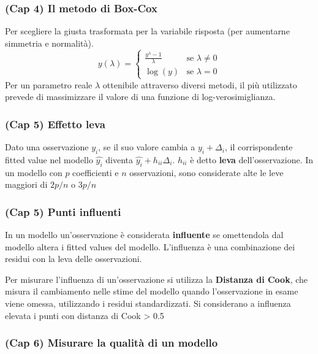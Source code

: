 \documentclass[
]{article}
\begin{document}
\hypertarget{cap-4-il-metodo-di-box-cox}{%
\subsubsection{(Cap 4) Il metodo di
Box-Cox}\label{cap-4-il-metodo-di-box-cox}}

Per scegliere la giusta trasformata per la variabile risposta (per
aumentarne simmetria e normalità). \[ y(\lambda) =
\begin{cases}
\frac{y^{\lambda}-1}{\lambda}   &\text{se $\lambda \neq 0$} \\
\log(y)     &\text{se $\lambda = 0$}
\end{cases}
\] Per un parametro reale \(\lambda\) ottenibile attraverso diversi
metodi, il più utilizzato prevede di massimizzare il valore di una
funzione di log-verosimiglianza.

\hypertarget{cap-5-effetto-leva}{%
\subsubsection{(Cap 5) Effetto leva}\label{cap-5-effetto-leva}}

Dato una osservazione \(y_i\), se il suo valore cambia a
\(y_i + \Delta_i\), il corrispondente fitted value nel modello
\(\hat{y_i}\) diventa \(\hat{y_i}+h_{ii}\Delta_i\). \(h_{ii}\) è detto
\textbf{leva} dell'osservazione. In un modello con \(p\) coefficienti e
\(n\) osservazioni, sono considerate alte le leve maggiori di \(2p/n\) o
\(3p/n\)

\hypertarget{cap-5-punti-influenti}{%
\subsubsection{(Cap 5) Punti influenti}\label{cap-5-punti-influenti}}

In un modello un'osservazione è considerata \textbf{influente} se
omettendola dal modello altera i fitted values del modello. L'influenza
è una combinazione dei residui con la leva delle osservazioni.

Per misurare l'influenza di un'osservazione si utilizza la
\textbf{Distanza di Cook}, che misura il cambiamento nelle stime del
modello quando l'osservazione in esame viene omessa, utilizzando i
residui standardizzati. Si considerano a influenza elevata i punti con
distanza di Cook \textgreater{} 0.5

\hypertarget{cap-6-misurare-la-qualituxe0-di-un-modello}{%
\subsubsection{(Cap 6) Misurare la qualità di un
modello}\label{cap-6-misurare-la-qualituxe0-di-un-modello}}
\end{document}
